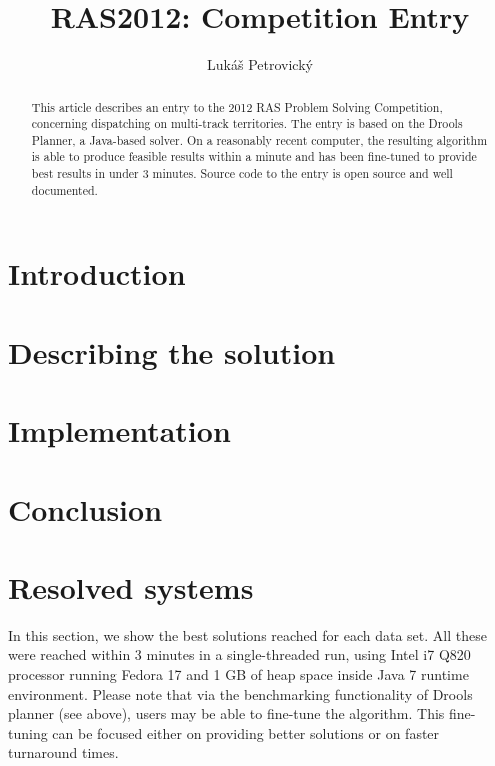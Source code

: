 \documentclass[10pt,a4paper,draft]{article}
\author{Lukáš Petrovický}
\title{RAS2012: Competition Entry}
\begin{document}
\maketitle

\begin{abstract}
This article describes an entry to the 2012 RAS Problem Solving Competition, concerning dispatching on multi-track territories. The entry is based on the Drools Planner, a Java-based solver. On a reasonably recent computer, the resulting algorithm is able to produce feasible results within a minute and has been fine-tuned to provide best results in under 3 minutes. Source code to the entry is open source and well documented.
\end{abstract}

\section{Introduction}

\section{Describing the solution}

\section{Implementation}

\section{Conclusion}

\appendix

\section{Resolved systems}

In this section, we show the best solutions reached for each data set. All these were reached within 3 minutes in a single-threaded run, using Intel i7 Q820 processor running Fedora 17 and 1 GB of heap space inside Java 7 runtime environment. Please note that via the benchmarking functionality of Drools planner (see above), users may be able to fine-tune the algorithm. This fine-tuning can be focused either on providing better solutions or on faster turnaround times.





\end{document}
